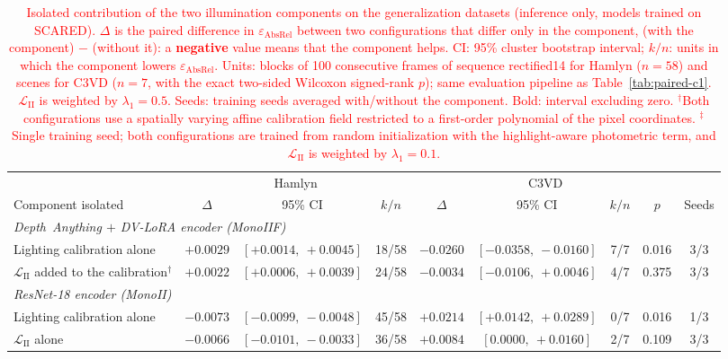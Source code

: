 \documentclass[a4paper,fleqn]{cas-dc}
\begin{document}
\begin{table}[t]
\centering
\color{red}
\caption{\textcolor{red}{Isolated contribution of the two illumination components on the generalization datasets (inference only, models trained on SCARED). $\Delta$ is the paired difference in $\varepsilon_\textrm{AbsRel}$ between two configurations that differ only in the component, (with the component) $-$ (without it): a \textbf{negative} value means that the component helps. CI: 95\% cluster bootstrap interval; $k/n$: units in which the component lowers $\varepsilon_\textrm{AbsRel}$. Units: blocks of 100 consecutive frames of sequence rectified14 for Hamlyn ($n=58$) and scenes for C3VD ($n=7$, with the exact two-sided Wilcoxon signed-rank $p$); same evaluation pipeline as Table~\ref{tab:paired-c1}. $\mathcal{L}_\textrm{II}$ is weighted by $\lambda_1=0.5$. Seeds: training seeds averaged with/without the component. Bold: interval excluding zero. $^{\dagger}$Both configurations use a spatially varying affine calibration field restricted to a first-order polynomial of the pixel coordinates. $^{\ddagger}$Single training seed; both configurations are trained from random initialization with the highlight-aware photometric term, and $\mathcal{L}_\textrm{II}$ is weighted by $\lambda_1=0.1$.}}
\label{tab:components-crossdomain}
\small
\setlength{\tabcolsep}{5pt}
\begin{tabular}{l rcc rccc c}
\toprule
 & \multicolumn{3}{c}{Hamlyn} & \multicolumn{4}{c}{C3VD} & \\
\cmidrule(lr){2-4}\cmidrule(lr){5-8}
Component isolated & \multicolumn{1}{c}{$\Delta$} & 95\% CI & $k/n$ & \multicolumn{1}{c}{$\Delta$} & 95\% CI & $k/n$ & $p$ & Seeds \\
\midrule
\multicolumn{9}{l}{\emph{Depth~Anything $+$ DV-LoRA encoder (MonoIIF)}} \\
\quad Lighting calibration alone & $\mathbf{+0.0029}$ & $[+0.0014,\ +0.0045]$ & 18/58 & $\mathbf{-0.0260}$ & $[-0.0358,\ -0.0160]$ & 7/7 & 0.016 & 3/3 \\
\quad $\mathcal{L}_\textrm{II}$ added to the calibration$^{\dagger}$ & $\mathbf{+0.0022}$ & $[+0.0006,\ +0.0039]$ & 24/58 & $-0.0034$ & $[-0.0106,\ +0.0046]$ & 4/7 & 0.375 & 3/3 \\
\midrule
\multicolumn{9}{l}{\emph{ResNet-18 encoder (MonoII)}} \\
\quad Lighting calibration alone & $\mathbf{-0.0073}$ & $[-0.0099,\ -0.0048]$ & 45/58 & $\mathbf{+0.0214}$ & $[+0.0142,\ +0.0289]$ & 0/7 & 0.016 & 1/3 \\
\quad $\mathcal{L}_\textrm{II}$ alone & $\mathbf{-0.0066}$ & $[-0.0101,\ -0.0033]$ & 36/58 & $+0.0084$ & $[0.0000,\ +0.0160]$ & 2/7 & 0.109 & 3/3 \\

\end{tabular}
\end{table}
\end{document}
